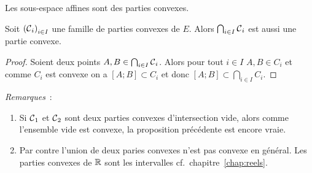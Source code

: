 \begin{cor}
  Les sous-espace affines sont des parties convexes.
\end{cor}
%
\begin{prop}
  Soit \({(\mathcal{C}{}_i)}_{i \in I}\) une famille de parties convexes de \(E\).
  Alors \(\bigcap_{i \in I} \mathcal{C}{}_i\) est aussi une partie convexe.
\end{prop}
\begin{proof}
  Soient deux points \(A,B \in \bigcap_{i\in I} \mathcal{C}{}_i\). Alors pour tout
  \(i \in I\) \(A,B \in C_i\) et comme \(C_i\) est convexe on a \([A;B] \subset
  C_i\) et donc \([A;B] \subset \bigcap_{i \in I} C_i\).
\end{proof}
%
\emph{Remarques}~:
\begin{enumerate}
  \item Si \(\mathcal{C}{}_1\) et \(\mathcal{C}{}_2\)  sont deux parties convexes
    d'intersection vide, alors comme l'ensemble vide est convexe, la proposition
    précédente est encore vraie.
  \item Par contre l'union de deux paries convexes n'est pas convexe en général.
    Les parties convexes de \(\mathbb{R}\) sont les intervalles cf.\ chapitre~\ref{chap:reels}.
\end{enumerate}
